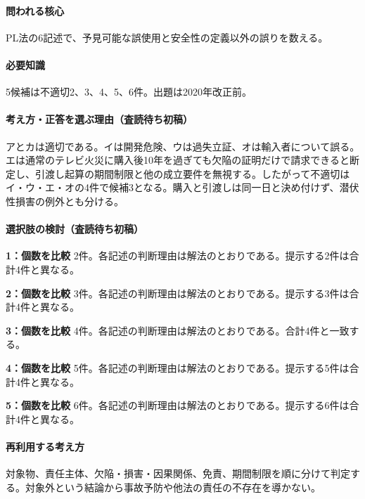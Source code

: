 \paragraph{問われる核心} PL法の6記述で、予見可能な誤使用と安全性の定義以外の誤りを数える。

\paragraph{必要知識} 5候補は不適切2、3、4、5、6件。出題は2020年改正前。

\paragraph{考え方・正答を選ぶ理由（査読待ち初稿）} アとカは適切である。イは開発危険、ウは過失立証、オは輸入者について誤る。エは通常のテレビ火災に購入後10年を過ぎても欠陥の証明だけで請求できると断定し、引渡し起算の期間制限と他の成立要件を無視する。したがって不適切はイ・ウ・エ・オの4件で候補3となる。購入と引渡しは同一日と決め付けず、潜伏性損害の例外とも分ける。

\paragraph{選択肢の検討（査読待ち初稿）}\mbox{}\par

\noindent\textbf{1：個数を比較} 2件。各記述の判断理由は解法のとおりである。提示する2件は合計4件と異なる。\par

\noindent\textbf{2：個数を比較} 3件。各記述の判断理由は解法のとおりである。提示する3件は合計4件と異なる。\par

\noindent\textbf{3：個数を比較} 4件。各記述の判断理由は解法のとおりである。合計4件と一致する。\par

\noindent\textbf{4：個数を比較} 5件。各記述の判断理由は解法のとおりである。提示する5件は合計4件と異なる。\par

\noindent\textbf{5：個数を比較} 6件。各記述の判断理由は解法のとおりである。提示する6件は合計4件と異なる。\par

\paragraph{再利用する考え方} 対象物、責任主体、欠陥・損害・因果関係、免責、期間制限を順に分けて判定する。対象外という結論から事故予防や他法の責任の不存在を導かない。

